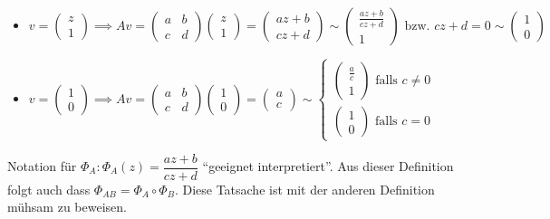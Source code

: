 \documentclass[../main.tex]{subfiles}
\begin{document}
\begin{itemize}
    \item $v = \begin{pmatrix}
        z \\ 1
    \end{pmatrix} \implies Av = \begin{pmatrix}a&b\\c&d\end{pmatrix}\begin{pmatrix}z \\ 1\end{pmatrix}=\begin{pmatrix}az+b\\cz+d\end{pmatrix}
    \sim \begin{pmatrix}\frac{az+b}{cz+d} \\ 1\end{pmatrix}\text{ bzw. } cz+d=0 \sim \begin{pmatrix}1\\0\end{pmatrix}$\nolinebreak

    \item $v = \begin{pmatrix}1 \\ 0 \end{pmatrix} \implies Av = \begin{pmatrix}a&b\\c&d\end{pmatrix}\begin{pmatrix}1 \\ 0\end{pmatrix}=\begin{pmatrix}a \\ c \end{pmatrix}
    \sim \begin{cases}
        \begin{pmatrix}\frac{a}{c}\\1 \end{pmatrix}\text{ falls } c \not = 0 \\
        \begin{pmatrix}1\\0 \end{pmatrix} \text{ falls } c = 0
            
    \end{cases}$
\end{itemize}

Notation für $\Phi _A : \Phi _A(z)= \dfrac{az+b}{cz+d}$
``geeignet interpretiert''.
Aus dieser Definition folgt auch dass $\Phi _{AB} = \Phi _A \circ \Phi _B$. Diese Tatsache ist mit der anderen Definition
mühsam zu beweisen.
\end{document}
